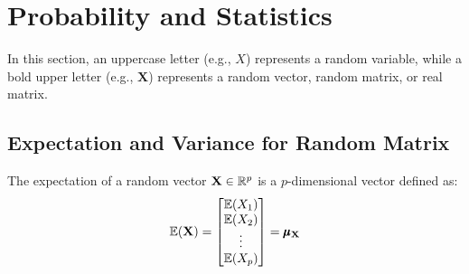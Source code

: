 \section{Probability and Statistics}
    In this section, an uppercase letter (e.g., $X$) represents a random variable, while a bold upper letter (e.g., $\mathbf{X}$) represents a random vector, random matrix, or real matrix.
    \subsection{Expectation and Variance for Random Matrix}
    \begin{Def}
        The expectation of a random vector $\mathbf{X} \in \mathbb{R}^p$ is a $p$-dimensional vector defined as:
        \begin{equation*}
            \mathbb{E}(\mathbf{X}) = \begin{bmatrix}
                \mathbb{E}(X_1)\\
                \mathbb{E}(X_2)\\
                \vdots \\
                \mathbb{E}(X_p)
            \end{bmatrix} = \pmb{\mu}_{\mathbf{X}}
        \end{equation*}
    \end{Def}

